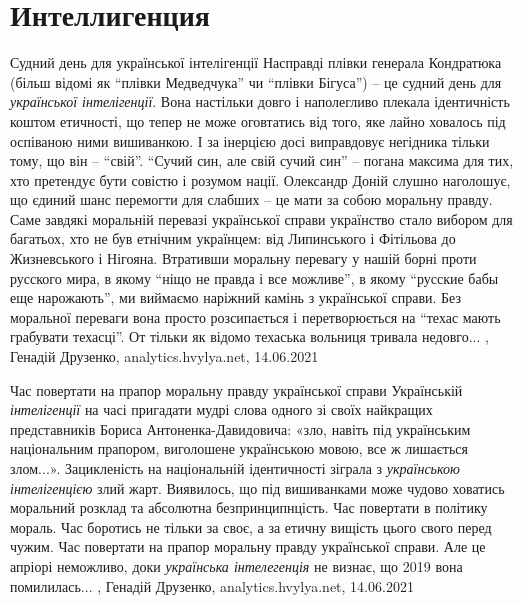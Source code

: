 
 
 
 
 
\chapter{Интеллигенция}

Судний день для української інтелігенції
Насправді плівки генерала Кондратюка (більш відомі як \enquote{плівки Медведчука} чи
\enquote{плівки Бігуса}) – це судний день для \emph{української інтелігенції}. Вона настільки
довго і наполегливо плекала ідентичність коштом етичності, що тепер не може
оговтатись від того, яке лайно ховалось під оспіваною ними вишиванкою. І за
інерцією досі виправдовує негідника тільки тому, що він – \enquote{свій}.  \enquote{Сучий син,
але свій сучий син} – погана максима для тих, хто претендує бути совістю і
розумом нації. Олександр Доній слушно наголошує, що єдиний шанс перемогти для
слабших – це мати за собою моральну правду. Саме завдякі моральній перевазі
української справи українство стало вибором для багатьох, хто не був етнічним
українцем: від Липинського і Фітільова до Жизневського і Нігояна.  Втративши
моральну перевагу у нашій борні проти русского мира, в якому \enquote{ніщо не правда і
все можливе}, в якому \enquote{русские бабы еще нарожають}, ми виймаємо наріжний камінь
з української справи. Без моральної переваги вона просто розсипається і
перетворюється на \enquote{техас мають грабувати техасці}. От тільки як відомо техаська
вольниця тривала недовго...
, Генадій Друзенко, 
analytics.hvylya.net, 14.06.2021

Час повертати на прапор моральну правду української справи
Українській \emph{інтелігенції} на часі пригадати мудрі слова одного зі своїх
найкращих представників Бориса Антоненка-Давидовича: «зло, навіть під
українським національним прапором, виголошене українською мовою, все ж
лишається злом...».  Зацикленість на національній ідентичності зіграла з
\emph{українською інтелігенцією} злий жарт. Виявилось, що під вишиванками може чудово
ховатись моральний розклад та абсолютна безпринципнцість. Час повертати в
політику мораль. Час боротись не тільки за своє, а за етичну вищість цього
свого перед чужим. Час повертати на прапор моральну правду української справи.
Але це апріорі неможливо, доки \emph{українська інтелегенція} не визнає, що 2019 вона
помилилась...
, Генадій Друзенко, 
analytics.hvylya.net, 14.06.2021

